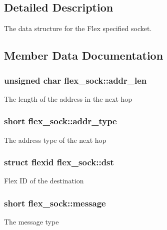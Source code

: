 \subsection{Detailed Description}
The data structure for the Flex specified socket. 

\subsection{Member Data Documentation}
\subsubsection[{\texorpdfstring{addr\+\_\+len}{addr_len}}]{\setlength{\rightskip}{0pt plus 5cm}unsigned char flex\+\_\+sock\+::addr\+\_\+len}\hypertarget{structflex__sock_a1c183d812ac68e320df127d58d303677}{}\label{structflex__sock_a1c183d812ac68e320df127d58d303677}
The length of the address in the next hop 
\subsubsection[{\texorpdfstring{addr\+\_\+type}{addr_type}}]{\setlength{\rightskip}{0pt plus 5cm}short flex\+\_\+sock\+::addr\+\_\+type}\hypertarget{structflex__sock_afb460ef1d9e2fc1cc389ca5922f967d8}{}\label{structflex__sock_afb460ef1d9e2fc1cc389ca5922f967d8}
The address type of the next hop 
\subsubsection[{\texorpdfstring{dst}{dst}}]{\setlength{\rightskip}{0pt plus 5cm}struct {\bf flexid} flex\+\_\+sock\+::dst}\hypertarget{structflex__sock_a1704e9612c290ef88bf674ea245b1835}{}\label{structflex__sock_a1704e9612c290ef88bf674ea245b1835}
Flex ID of the destination 
\subsubsection[{\texorpdfstring{message}{message}}]{\setlength{\rightskip}{0pt plus 5cm}short flex\+\_\+sock\+::message}\hypertarget{structflex__sock_af4d0be6245faa22590e3d672d095a2a7}{}\label{structflex__sock_af4d0be6245faa22590e3d672d095a2a7}
The message type 

